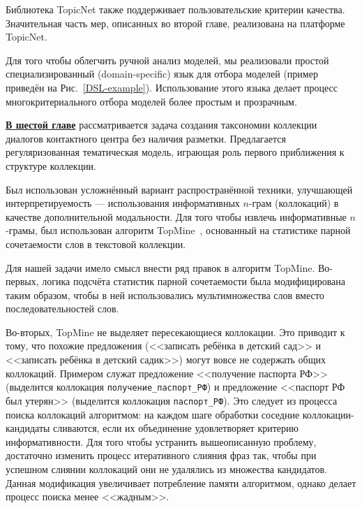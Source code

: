 Библиотека TopicNet также поддерживает пользовательские критерии качества. Значительная часть мер, описанных во второй главе, реализована на платформе TopicNet.  

Для того чтобы облегчить ручной анализ моделей, мы реализовали простой специализированный (domain-specific) язык для отбора моделей (пример приведён на Рис.~\ref{DSL-example}). Использование этого языка делает процесс многокритериального отбора моделей более простым и прозрачным.  

\underline{\textbf{В шестой главе}} рассматривается задача создания таксономии коллекции диалогов контактного центра без наличия разметки. Предлагается регуляризованная тематическая модель, играющая роль первого приближения к структуре коллекции.

Был использован усложнённый вариант распространённой техники, улучшающей интерпретируемость --- использования информативных $n$-грам (коллокаций) в качестве дополнительной модальности. Для того чтобы извлечь информативные $n$-грамы, был использован алгоритм TopMine~\cite{topmine}, основанный на статистике парной сочетаемости слов в текстовой коллекции.

Для нашей задачи имело смысл внести ряд правок в алгоритм TopMine. Во-первых, логика подсчёта статистик парной сочетаемости была модифицирована таким образом, чтобы в ней использовались мультимножества слов вместо последовательностей слов. 

Во-вторых, TopMine не выделяет пересекающиеся коллокации. Это приводит к тому, что похожие предложения (<<записать ребёнка в детский сад>> и <<записать ребёнка в детский садик>>) могут вовсе не содержать общих коллокаций. Примером служат предложение <<получение паспорта РФ>> (выделится коллокация \texttt{получение\_паспорт\_РФ}) и предложение <<паспорт РФ был утерян>> (выделится коллокация \texttt{паспорт\_РФ}). Это следует из процесса поиска коллокаций алгоритмом: на каждом шаге обработки соседние коллокации-кандидаты сливаются, если их объединение удовлетворяет критерию информативности. Для того чтобы устранить вышеописанную проблему, достаточно изменить процесс итеративного слияния фраз так, чтобы при успешном слиянии коллокаций они не удалялись из множества кандидатов. Данная модификация увеличивает потребление памяти алгоритмом, однако делает процесс поиска менее <<жадным>>.


